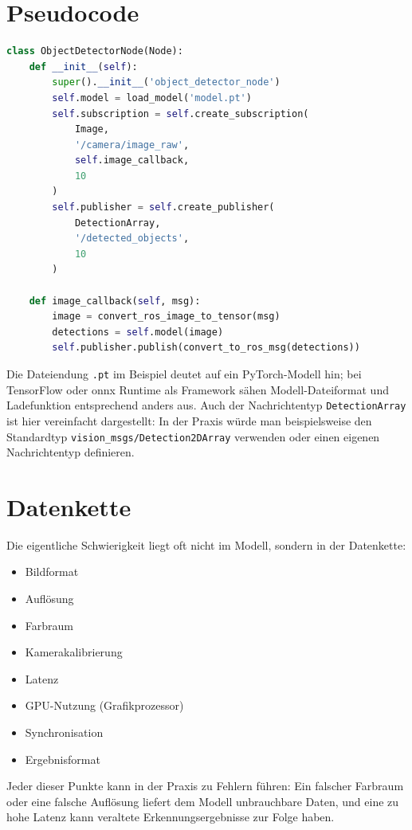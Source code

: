 \section{Pseudocode}
\begin{lstlisting}[language=Python]
class ObjectDetectorNode(Node):
    def __init__(self):
        super().__init__('object_detector_node')
        self.model = load_model('model.pt')
        self.subscription = self.create_subscription(
            Image,
            '/camera/image_raw',
            self.image_callback,
            10
        )
        self.publisher = self.create_publisher(
            DetectionArray,
            '/detected_objects',
            10
        )

    def image_callback(self, msg):
        image = convert_ros_image_to_tensor(msg)
        detections = self.model(image)
        self.publisher.publish(convert_to_ros_msg(detections))
\end{lstlisting}

Die Dateiendung \texttt{.pt} im Beispiel deutet auf ein PyTorch-Modell hin; bei TensorFlow oder \gls{onnx} Runtime als Framework sähen Modell-Dateiformat und Ladefunktion entsprechend anders aus. Auch der Nachrichtentyp \texttt{DetectionArray} ist hier vereinfacht dargestellt: In der Praxis würde man beispielsweise den Standardtyp \texttt{vision\_msgs/Detection2DArray} verwenden oder einen eigenen Nachrichtentyp definieren.

\section{Datenkette}
Die eigentliche Schwierigkeit liegt oft nicht im Modell, sondern in der Datenkette:

\begin{itemize}
    \item Bildformat
    \item Auflösung
    \item Farbraum
    \item Kamerakalibrierung
    \item Latenz
    \item GPU-Nutzung (Grafikprozessor)
    \item Synchronisation
    \item Ergebnisformat
\end{itemize}

Jeder dieser Punkte kann in der Praxis zu Fehlern führen: Ein falscher Farbraum oder eine falsche Auflösung liefert dem Modell unbrauchbare Daten, und eine zu hohe Latenz kann veraltete Erkennungsergebnisse zur Folge haben.

